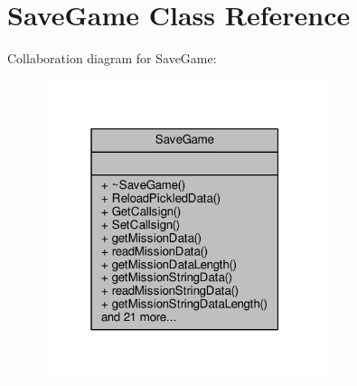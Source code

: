 \hypertarget{classSaveGame}{}\section{Save\+Game Class Reference}
\label{classSaveGame}


Collaboration diagram for Save\+Game\+:
\nopagebreak
\begin{figure}[H]
\begin{center}
\leavevmode
\includegraphics[width=235pt]{d4/d99/classSaveGame__coll__graph}
\end{center}
\end{figure}
